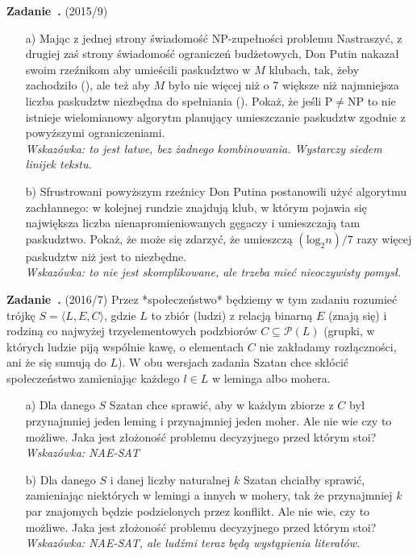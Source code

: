 \documentclass[11pt]{article}
\newcounter{exercise}
\newenvironment{exercise}[1]{\refstepcounter{exercise}\par\medskip
   \noindent\textbf{Zadanie~\theexercise.} (#1) \rmfamily}{\medskip}
\begin{document}
\begin{exercise}{2015/9}
\begin{itemize}
	\item[a)] Mając z jednej strony świadomość NP-zupełności problemu Nastraszyć, z drugiej zaś strony świadomość ograniczeń budżetowych, Don Putin nakazał swoim rzeźnikom aby umieścili paskudztwo w $M$ klubach, tak, żeby zachodziło (\*), ale też aby $M$ było nie więcej niż o 7 większe niż najmniejsza liczba paskudztw niezbędna do spełniania (\*). Pokaż, że jeśli P$\neq$NP to nie istnieje wielomianowy algorytm planujący umieszczanie paskudztw zgodnie z powyższymi ograniczeniami. \\
	\textit{Wskazówka: to jest łatwe, bez żadnego kombinowania. Wystarczy siedem linijek tekstu.}
	\item[b)] Sfrustrowani powyższym rzeźnicy Don Putina postanowili użyć algorytmu zachłannego: w kolejnej rundzie znajdują klub, w którym pojawia się największa liczba nienapromieniowanych gęgaczy i umieszczają tam paskudztwo. Pokaż, że może się zdarzyć, że umieszczą $(\text{log}_2 n)/7$ razy więcej paskudztw niż jest to niezbędne. \\
	\textit{Wskazówka: to nie jest skomplikowane, ale trzeba mieć nieoczywisty pomysł.}
\end{itemize}
\end{exercise}





\begin{exercise}{2016/7}
Przez *społeczeństwo* będziemy w tym zadaniu rozumieć trójkę $S = \langle L,E,C \rangle$, gdzie $L$ to zbiór (ludzi) z relacją binarną $E$ (znają się) i rodziną co najwyżej trzyelementowych podzbiorów $C \subseteq \mathcal{P}(L)$ (grupki, w których ludzie piją wspólnie kawę, o elementach $C$ nie zakładamy rozłączności, ani że się sumują do $L$). W obu wersjach zadania Szatan chce skłócić społeczeństwo zamieniając każdego $l \in L$ w leminga albo mohera.
\begin{itemize}
    \item[a)] Dla danego $S$ Szatan chce sprawić, aby w każdym zbiorze z $C$ był przynajmniej jeden leming i przynajmniej jeden moher. Ale nie wie czy to możliwe. Jaka jest złożoność problemu decyzyjnego przed którym stoi? \\
    \textit{Wskazówka: NAE-SAT}
    \item[b)] Dla danego $S$ i danej liczby naturalnej $k$ Szatan chciałby sprawić, zamieniając niektórych w lemingi a innych w mohery, tak że przynajmniej $k$ par znajomych będzie podzielonych przez konflikt. Ale nie wie, czy to możliwe. Jaka jest złożoność problemu decyzyjnego przed którym stoi? \\
    \textit{Wskazówka: NAE-SAT, ale ludźmi teraz będą wystąpienia literałów.}
\end{itemize}
\end{exercise}
\end{document}
